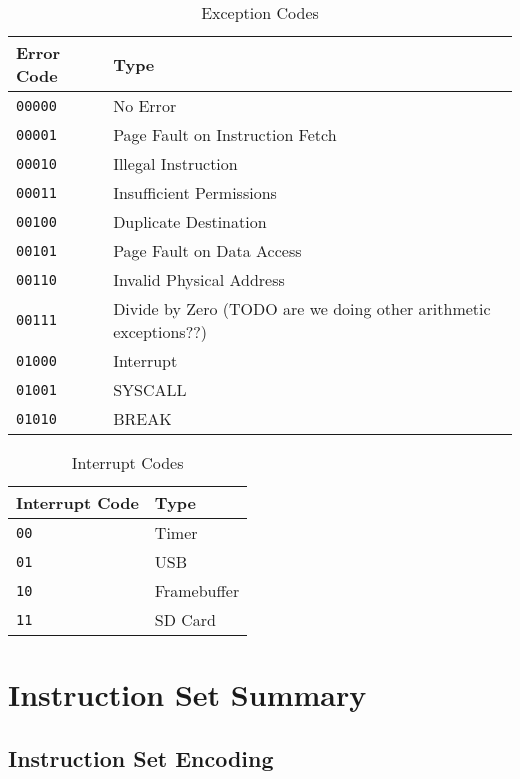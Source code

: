 \documentclass[11pt,openany]{report}
\begin{document}
\begin{table}[!h]
\begin{tabular}{l|l}
Error Code & Type\\
\hline
\texttt{00000} & No Error\\
\texttt{00001} & Page Fault on Instruction Fetch\\
\texttt{00010} & Illegal Instruction\\
\texttt{00011} & Insufficient Permissions\\
\texttt{00100} & Duplicate Destination\\
\texttt{00101} & Page Fault on Data Access\\
\texttt{00110} & Invalid Physical Address\\
\texttt{00111} & Divide by Zero (TODO are we doing other arithmetic exceptions??)\\
\texttt{01000} & Interrupt\\
\texttt{01001} & SYSCALL\\
\texttt{01010} & BREAK
\end{tabular}
\caption{Exception Codes}
\label{tab:exncodes}
\end{table}

\begin{table}[!h]
\begin{tabular}{l|l}
Interrupt Code & Type\\
\hline
\texttt{00} & Timer\\
\texttt{01} & USB\\
\texttt{10} & Framebuffer\\
\texttt{11} & SD Card
\end{tabular}
\caption{Interrupt Codes}
\label{tab:intcodes}
\end{table}



\chapter{Instruction Set Summary}

\section{Instruction Set Encoding}
\end{document}
